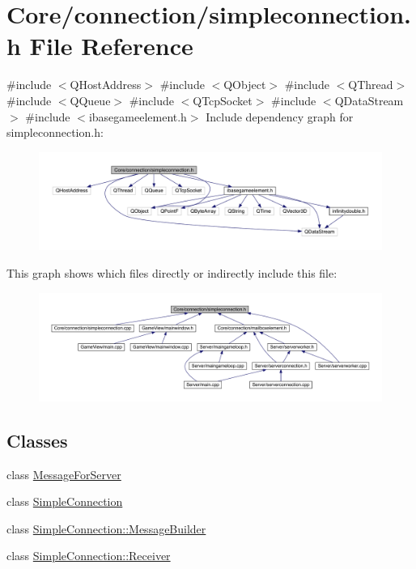 \hypertarget{a00008}{}\section{Core/connection/simpleconnection.h File Reference}
\label{a00008}
{\ttfamily \#include $<$Q\+Host\+Address$>$}\newline
{\ttfamily \#include $<$Q\+Object$>$}\newline
{\ttfamily \#include $<$Q\+Thread$>$}\newline
{\ttfamily \#include $<$Q\+Queue$>$}\newline
{\ttfamily \#include $<$Q\+Tcp\+Socket$>$}\newline
{\ttfamily \#include $<$Q\+Data\+Stream$>$}\newline
{\ttfamily \#include $<$ibasegameelement.\+h$>$}\newline
Include dependency graph for simpleconnection.\+h\+:
\nopagebreak
\begin{figure}[H]
\begin{center}
\leavevmode
\includegraphics[width=350pt]{da/da0/a00009}
\end{center}
\end{figure}
This graph shows which files directly or indirectly include this file\+:
\nopagebreak
\begin{figure}[H]
\begin{center}
\leavevmode
\includegraphics[width=350pt]{d7/dec/a00010}
\end{center}
\end{figure}
\subsection*{Classes}
\begin{DoxyCompactItemize}
\item 
class \hyperlink{a00121}{Message\+For\+Server}
\item 
class \hyperlink{a00125}{Simple\+Connection}
\item 
class \hyperlink{a00129}{Simple\+Connection\+::\+Message\+Builder}
\item 
class \hyperlink{a00133}{Simple\+Connection\+::\+Receiver}
\end{DoxyCompactItemize}
